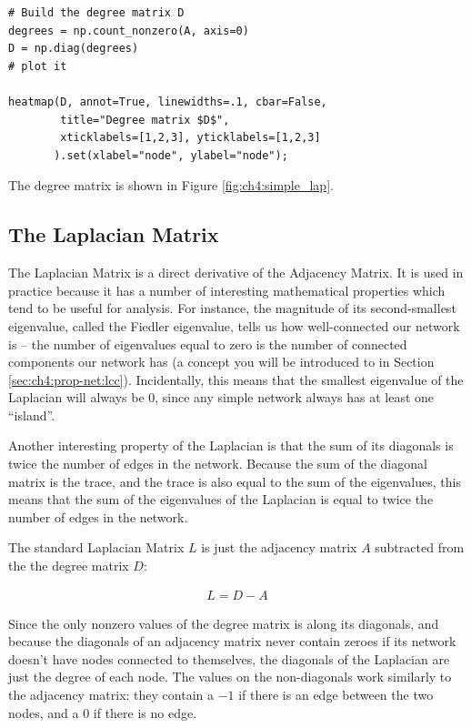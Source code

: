 \begin{lstlisting}[style=python]
# Build the degree matrix D
degrees = np.count_nonzero(A, axis=0)
D = np.diag(degrees)
# plot it

heatmap(D, annot=True, linewidths=.1, cbar=False, 
        title="Degree matrix $D$", 
        xticklabels=[1,2,3], yticklabels=[1,2,3]
       ).set(xlabel="node", ylabel="node");

\end{lstlisting}
The degree matrix is shown in Figure \ref{fig:ch4:simple_lap}.

\subsection{The Laplacian Matrix}

The Laplacian Matrix is a direct derivative of the Adjacency Matrix. It is used in practice because it has a number of interesting mathematical properties which tend to be useful for analysis. For instance, the magnitude of its second-smallest eigenvalue, called the Fiedler eigenvalue, tells us how well-connected our network is -- the number of eigenvalues equal to zero is the number of connected components our network has (a concept you will be introduced to in Section \ref{sec:ch4:prop-net:lcc}). Incidentally, this means that the smallest eigenvalue of the Laplacian will always be 0, since any simple network always has at least one ``island''.

Another interesting property of the Laplacian is that the sum of its diagonals is twice the number of edges in the network. Because the sum of the diagonal matrix is the trace, and the trace is also equal to the sum of the eigenvalues, this means that the sum of the eigenvalues of the Laplacian is equal to twice the number of edges in the network.

The standard Laplacian Matrix $L$ \cite{Chung1996Dec} is just the adjacency matrix $A$ subtracted from the the degree matrix $D$:

\begin{align*}
 L = D - A
\end{align*}

Since the only nonzero values of the degree matrix is along its diagonals, and because the diagonals of an adjacency matrix never contain zeroes if its network doesn't have nodes connected to themselves, the diagonals of the Laplacian are just the degree of each node. The values on the non-diagonals work similarly to the adjacency matrix: they contain a $-1$ if there is an edge between the two nodes, and a $0$ if there is no edge.

